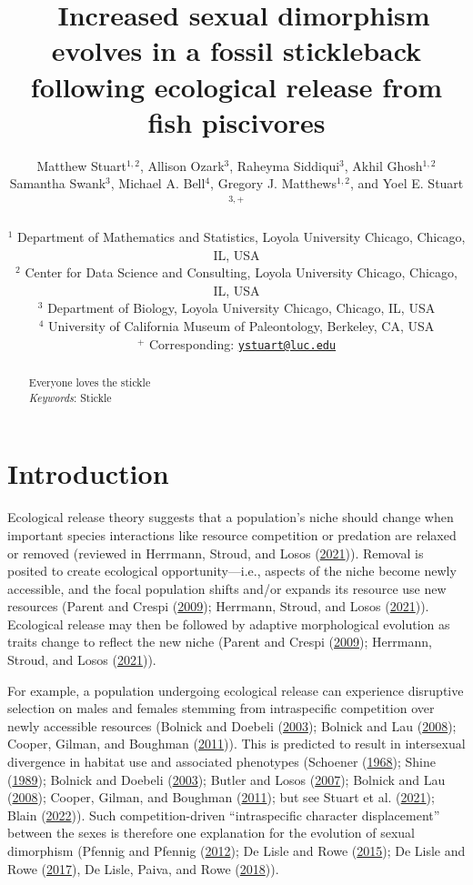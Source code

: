 \documentclass[
  12pt,
]{article}
\title{~\Large Increased sexual dimorphism evolves in a fossil
stickleback following ecological release from fish piscivores}
\author{\large Matthew Stuart\(^{1,2}\), Allison Ozark\(^{3}\), Raheyma
Siddiqui\(^3\), Akhil Ghosh\(^{1,2}\)\\
\large Samantha Swank\(^3\), Michael A. Bell\(^4\), Gregory J.
Matthews\(^{1,2}\), and Yoel E. Stuart\(^{3,+}\)\\
\vspace{-1.1mm}\\
\large \(^1\) Department of Mathematics and Statistics, Loyola
University Chicago, Chicago, IL, USA \vspace{-1.1mm}\\
\large \(^2\) Center for Data Science and Consulting, Loyola University
Chicago, Chicago, IL, USA \vspace{-1.1mm}\\
\large \(^3\) Department of Biology, Loyola University Chicago, Chicago,
IL, USA \vspace{-1.1mm}\\
\large \(^4\) University of California Museum of Paleontology, Berkeley,
CA, USA \vspace{-1.1mm}\\
\large \(^+\) Corresponding:
\href{mailto:ystuart@luc.edu}{\nolinkurl{ystuart@luc.edu}}
\vspace{-1.1mm}}
\date{}
\begin{document}
\maketitle
\begin{abstract}
Everyone loves the stickle \vspace{2mm}\\
\emph{Keywords}: Stickle
\end{abstract}

\newcommand{\iid}{\overset{iid}{\sim}}

\newpage

\hypertarget{sec:intro}{%
\section{Introduction}\label{sec:intro}}

Ecological release theory suggests that a population's niche should
change when important species interactions like resource competition or
predation are relaxed or removed (reviewed in Herrmann, Stroud, and
Losos (\protect\hyperlink{ref-Herrmannetal2021}{2021})). Removal is
posited to create ecological opportunity---i.e., aspects of the niche
become newly accessible, and the focal population shifts and/or expands
its resource use new resources (Parent and Crespi
(\protect\hyperlink{ref-ParentandCrespi2009}{2009}); Herrmann, Stroud,
and Losos (\protect\hyperlink{ref-Herrmannetal2021}{2021})). Ecological
release may then be followed by adaptive morphological evolution as
traits change to reflect the new niche (Parent and Crespi
(\protect\hyperlink{ref-ParentandCrespi2009}{2009}); Herrmann, Stroud,
and Losos (\protect\hyperlink{ref-Herrmannetal2021}{2021})).

For example, a population undergoing ecological release can experience
disruptive selection on males and females stemming from intraspecific
competition over newly accessible resources (Bolnick and Doebeli
(\protect\hyperlink{ref-BolnickandDoebeli2003}{2003}); Bolnick and Lau
(\protect\hyperlink{ref-BolnickandLau2008}{2008}); Cooper, Gilman, and
Boughman (\protect\hyperlink{ref-Cooperetal2011}{2011})). This is
predicted to result in intersexual divergence in habitat use and
associated phenotypes (Schoener
(\protect\hyperlink{ref-Schoener1968}{1968}); Shine
(\protect\hyperlink{ref-Shine1989}{1989}); Bolnick and Doebeli
(\protect\hyperlink{ref-BolnickandDoebeli2003}{2003}); Butler and Losos
(\protect\hyperlink{ref-Butleretal2007}{2007}); Bolnick and Lau
(\protect\hyperlink{ref-BolnickandLau2008}{2008}); Cooper, Gilman, and
Boughman (\protect\hyperlink{ref-Cooperetal2011}{2011}); but see Stuart
et al. (\protect\hyperlink{ref-Stuartetal2021}{2021}); Blain
(\protect\hyperlink{ref-Blain2022}{2022})). Such competition-driven
``intraspecific character displacement'' between the sexes is therefore
one explanation for the evolution of sexual dimorphism (Pfennig and
Pfennig (\protect\hyperlink{ref-PfennigandPfennig2012}{2012}); De Lisle
and Rowe (\protect\hyperlink{ref-DeLisleandRowe2015}{2015}); De Lisle
and Rowe (\protect\hyperlink{ref-DeLisleandRowe2017}{2017}), De Lisle,
Paiva, and Rowe (\protect\hyperlink{ref-DeLisleetal2018}{2018})).
\end{document}
